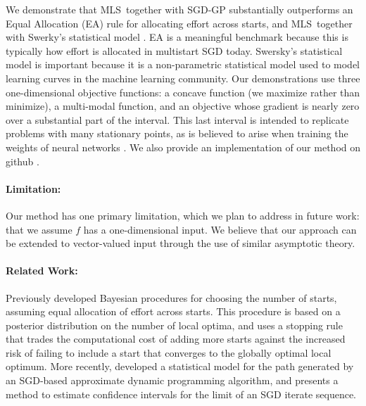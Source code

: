 \documentclass{wscpaperproc}
\newcommand{\stcomment}[1]{{\color{blue} ST: #1}}
\newcommand{\pfcomment}[1]{{\color{red} PF: #1}}
\theoremstyle{wsc}
\newcommand{\abbrv}{MLS}
\newcommand{\stedit}[1]{{\color{red} #1}}
\begin{document}
We demonstrate that \abbrv\ together with SGD-GP substantially outperforms an Equal Allocation (EA) rule for allocating effort across starts, and \abbrv\ together with Swerky's statistical model .  EA is a meaningful benchmark because this is typically how effort is allocated in multistart SGD today. Swersky's statistical model is important because it is a non-parametric statistical model used to model learning curves in the machine learning community.
Our demonstrations use three one-dimensional objective functions: a concave function (we maximize rather than minimize), a multi-modal function, and an objective whose gradient is nearly zero over a substantial part of the interval.  This last interval is intended to replicate problems with many stationary points, as is believed to arise when training the weights of neural networks
.
We also provide an implementation of our method on github \cite{MLS}.

\paragraph{Limitation:}
Our method has one primary limitation, which we plan to address in future work: that we assume $f$ has a one-dimensional input.  We believe that our approach can be extended to vector-valued input through the use of similar asymptotic theory.  


\paragraph{Related Work:}
Previously  developed Bayesian procedures for choosing the number of starts, assuming equal allocation of effort across starts.
This procedure is based on a posterior distribution on the number of local optima, and uses a stopping rule that trades the computational cost of adding more starts against the increased risk of failing to include a start that converges to the globally optimal local optimum. More recently,  developed a statistical model for the path generated by an SGD-based approximate dynamic programming algorithm, and  presents a method to estimate confidence intervals for the limit of an SGD iterate sequence.
\end{document}
